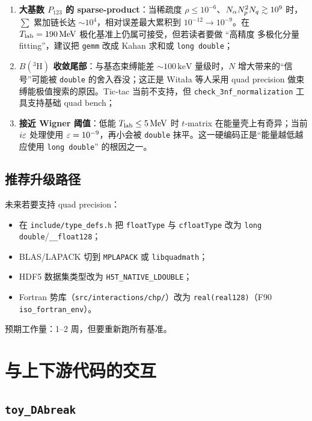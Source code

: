 \begin{enumerate}
  \item \textbf{大基数 \(P_{123}\) 的 sparse-product}：当稀疏度 \(\rho\le 10^{-6}\)、\(N_\alpha N_p^2 N_q\gtrsim 10^9\) 时，\(\sum\) 累加链长达
        \(\sim 10^4\)，相对误差最大累积到 \(10^{-12}\to 10^{-9}\)。在 \({T_{\text{lab}}}=190\,\mathrm{MeV}\) 极化基准上仍属可接受，但若读者要做 “高精度
        多极化分量 fitting”，建议把 \texttt{gemm} 改成 Kahan 求和或 \texttt{long double}；
  \item \textbf{\(B(^3\!\mathrm{H})\) 收敛尾部}：与基态束缚能差 \(\sim 100\,\mathrm{keV}\) 量级时，\(N\) 增大带来的“信号”可能被 \texttt{double} 的舍入吞没；这正是
        Witała 等人采用 quad precision 做束缚能极值搜索的原因。Tic-tac 当前不支持，但 \texttt{check\_3nf\_normalization} 工具支持基础 quad
        bench；
  \item \textbf{接近 Wigner 阈值}：低能 \({T_{\text{lab}}}\le 5\,\mathrm{MeV}\) 时 \(t\)-matrix 在能量壳上有奇异；当前 \(i\varepsilon\) 处理使用 \(\varepsilon=10^{-9}\)，再小会被
        \texttt{double} 抹平。这一硬编码正是“能量越低越应使用 \texttt{long double}” 的根因之一。
\end{enumerate}

\subsection{推荐升级路径}

未来若要支持 quad precision：
\begin{itemize}
  \item 在 \texttt{include/type\_defs.h} 把 \texttt{floatType} 与 \texttt{cfloatType} 改为 \texttt{long double}/\texttt{\_\_float128}；
  \item BLAS/LAPACK 切到 \texttt{MPLAPACK} 或 \texttt{libquadmath}；
  \item HDF5 数据集类型改为 \texttt{H5T\_NATIVE\_LDOUBLE}；
  \item Fortran 势库（\texttt{src/interactions/chp/}）改为 \texttt{real(real128)}（F90 \texttt{iso\_fortran\_env}）。
\end{itemize}
预期工作量：1–2 周，但要重新跑所有基准。

\section{与上下游代码的交互}
\label{sec:appF_neighbors}

\subsection{\texttt{toy\_DAbreak}}

